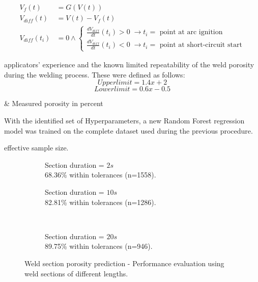     \begin{align}
        V_f(t)&=G(V(t))\label{eq:v_gauss_filter}\\
        V_{diff}(t)&=V(t)-V_f(t)\label{eq:v_diff}\\
        V_{diff}(t_i)&=0 \land
        \begin{cases}
            \frac{dV_{diff}}{dt}(t_i)> 0 \; \rightarrow \text{\(t_i=\) point at arc ignition} \\
            \frac{dV_{diff}}{dt}(t_i)< 0 \; \rightarrow \text{\(t_i=\) point at short-circuit start}
        \end{cases}
        \label{eq:voltage_phase_identification}
    \end{align}

applicators' experience and the known limited repeatability of the weld porosity during the welding process. These were defined as follows:
\[Upper limit = 1.4x + 2\]
\[Lower limit = 0.6x - 0.5\]
\begin{conditions}
     & Measured porosity in percent\\
\end{conditions}
With the identified set of Hyperparameters, a new Random Forest regression model was trained on the complete dataset used during the previous procedure.


effective sample size.

\begin{figure}[!htbp]
    \centering
    \begin{subfigure}[b]{0.5\textwidth}
        \caption{Section duration = \(2s\) \\ 68.36\% within tolerances (n=1558). }
    \end{subfigure}\hfill
    \begin{subfigure}[b]{0.5\textwidth}
        \caption{Section duration = \(10s\) \\ 82.81\% within tolerances (n=1286). }
    \end{subfigure}\\\vspace{0.5cm}
    
    \begin{subfigure}[b]{0.5\textwidth}
        \caption{Section duration = \(20s\) \\ 89.75\% within tolerances (n=946). }
    \end{subfigure}

    \caption{Weld section porosity prediction - Performance evaluation using weld sections of different lengths. }
    \label{fig:rfr_evaluation_sections_diff_lengths}
\end{figure}

